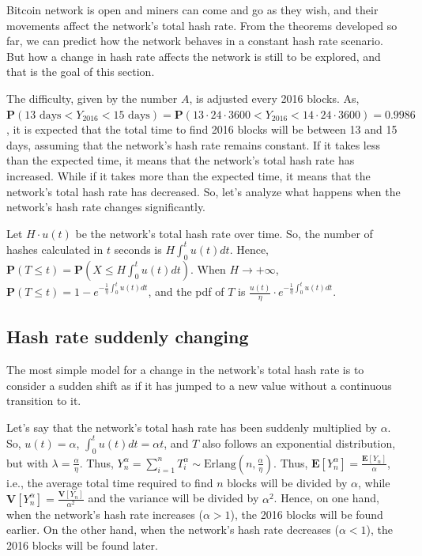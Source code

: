 Bitcoin network is open and miners can come and go as they wish, and their movements affect the network's total hash rate. From the theorems developed so far, we can predict how the network behaves in a constant hash rate scenario. But how a change in hash rate affects the network is still to be explored, and that is the goal of this section.

The difficulty, given by the number $A$, is adjusted every 2016 blocks. As, $\mathbf{P}(13 \text{ days} < Y_{2016} < 15 \text{ days}) = \mathbf{P}(13 \cdot 24 \cdot 3600 < Y_{2016} < 14 \cdot 24 \cdot 3600) = 0.9986$, it is expected that the total time to find 2016 blocks will be between 13 and 15 days, assuming that the network's hash rate remains constant. If it takes less than the expected time, it means that the network's total hash rate has increased. While if it takes more than the expected time, it means that the network's total hash rate has decreased. So, let's analyze what happens when the network's hash rate changes significantly.


Let $H \cdot u(t)$ be the network's total hash rate over time. So, the number of hashes calculated in $t$ seconds is $H \int_0^t u(t) dt$. Hence, $\mathbf{P}(T \leq t) = \mathbf{P}(X \leq H \int_0^t u(t)dt)$. When $H \rightarrow +\infty$, $\mathbf{P}(T \leq t) = 1 - e^{-\frac{1}{\eta} \int_0^t u(t) dt}$, and the pdf of $T$ is $\frac{u(t)}{\eta} \cdot e^{-\frac{1}{\eta} \int_0^t u(t)dt}$.

\subsection{Hash rate suddenly changing}

The most simple model for a change in the network's total hash rate is to consider a sudden shift as if it has jumped to a new value without a continuous transition to it.

Let's say that the network's total hash rate has been suddenly multiplied by $\alpha$. So, $u(t) = \alpha$, $\int_0^t u(t) dt = \alpha t$, and $T$ also follows an exponential distribution, but with $\lambda = \frac{\alpha}{\eta}$. Thus, $Y_n^\alpha = \sum_{i=1}^{n} T_i^\alpha \sim \text{Erlang}(n, \frac{\alpha}{\eta})$. Thus, $\mathbf{E}[Y_{n}^\alpha] = \frac{\mathbf{E}[Y_{n}]}{\alpha}$, i.e., the average total time required to find $n$ blocks will be divided by $\alpha$, while $\mathbf{V}[Y_{n}^\alpha] = \frac{\mathbf{V}[Y_n]}{\alpha^2}$ and the variance will be divided by $\alpha^2$. Hence, on one hand, when the network's hash rate increases ($\alpha > 1$), the 2016 blocks will be found earlier. On the other hand, when the network's hash rate decreases ($\alpha < 1$), the 2016 blocks will be found later.

